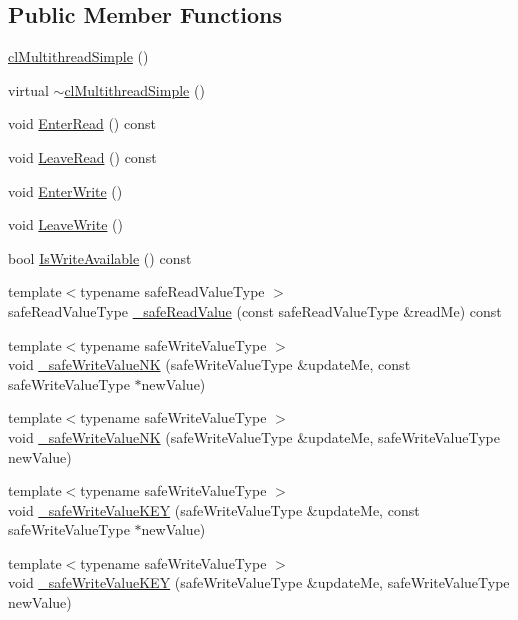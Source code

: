 \subsection*{Public Member Functions}
\begin{DoxyCompactItemize}
\item 
\hyperlink{classcl_multithread_simple_a5fd0c9c9c7c7b994da44c69b9b5fb31f}{clMultithreadSimple} ()
\item 
virtual \hyperlink{classcl_multithread_simple_a5fa92717c6c446acf20ef1b46aeb231e}{$\sim$clMultithreadSimple} ()
\item 
void \hyperlink{classcl_multithread_simple_af64d4f92e64bacc08025770c6a7894ad}{EnterRead} () const 
\item 
void \hyperlink{classcl_multithread_simple_a827167e20c5cdcdd904534fbf9af5666}{LeaveRead} () const 
\item 
void \hyperlink{classcl_multithread_simple_ac2b8707539b3a78e21973f1d649e035e}{EnterWrite} ()
\item 
void \hyperlink{classcl_multithread_simple_a436e7ee6ba51df8e75d23f6d283568a7}{LeaveWrite} ()
\item 
bool \hyperlink{classcl_multithread_simple_a9d726ff5cd6e27dfb02535a31fff94cd}{IsWriteAvailable} () const 
\item 
{\footnotesize template$<$typename safeReadValueType $>$ }\\safeReadValueType \hyperlink{classcl_multithread_simple_a897ecab9fe46ca411ecaf8ebf4d2ad64}{\_\-safeReadValue} (const safeReadValueType \&readMe) const 
\item 
{\footnotesize template$<$typename safeWriteValueType $>$ }\\void \hyperlink{classcl_multithread_simple_a21fca44e9a4ebf59eb202af3c59d80bd}{\_\-safeWriteValueNK} (safeWriteValueType \&updateMe, const safeWriteValueType $\ast$newValue)
\item 
{\footnotesize template$<$typename safeWriteValueType $>$ }\\void \hyperlink{classcl_multithread_simple_a3c9a5f56b268b713b9bbcd2694834d90}{\_\-safeWriteValueNK} (safeWriteValueType \&updateMe, safeWriteValueType newValue)
\item 
{\footnotesize template$<$typename safeWriteValueType $>$ }\\void \hyperlink{classcl_multithread_simple_aa66393344a309bd3230e76b3dc1c6b81}{\_\-safeWriteValueKEY} (safeWriteValueType \&updateMe, const safeWriteValueType $\ast$newValue)
\item 
{\footnotesize template$<$typename safeWriteValueType $>$ }\\void \hyperlink{classcl_multithread_simple_afbb87f082f9ac006a6aff65ce4a80940}{\_\-safeWriteValueKEY} (safeWriteValueType \&updateMe, safeWriteValueType newValue)
\end{DoxyCompactItemize}
